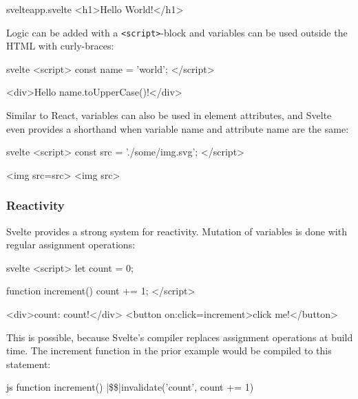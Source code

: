 \begin{myminted}{svelte}{app.svelte}
<h1>Hello World!</h1> 
\end{myminted}

Logic can be added with a \texttt{<script>}-block and variables can be used outside the HTML with curly-braces:

\begin{myminted}{svelte}{}
<script>
    const name = 'world';
</script>

<div>Hello {name.toUpperCase()}!</div>
\end{myminted}

Similar to React, variables can also be used in element attributes, and Svelte even provides a shorthand when variable name and attribute name are the same:
\begin{myminted}{svelte}{}
<script>
    const src = './some/img.svg';
</script>

<img src={src}>
<img {src}> 
\end{myminted}


\subsubsection{Reactivity}

Svelte provides a strong system for reactivity. Mutation of variables is done with regular assignment operations:

\begin{myminted}{svelte}{}
<script>
    let count = 0;

    function increment() {
        count += 1;
    }
</script>

<div>count: {count}!</div>
<button on:click={increment}>click me!</button>
\end{myminted}

This is possible, because Svelte's compiler replaces assignment operations at build time. The increment function in the prior example would be compiled to this statement:

\begin{myminted}[escapeinside=||]{js}{}
function increment() {
    |\$\$|invalidate('count', count += 1)
}
\end{myminted}


